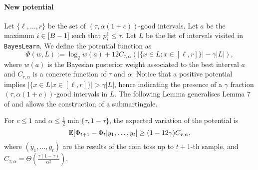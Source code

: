\paragraph{New potential} Let $\{\ell,\dots,r\}$ be the set of $(\tau,\alpha(1+c))$-good intervals. Let $a$ be the maximum $i \in [B-1]$ such that $p^1_i\leq \tau$. Let $L$ be the list of intervals visited in \texttt{BayesLearn}. We define the potential function as 
\begin{equation*}
\label{eq: new potential}
    \Phi(w, L) := \log_2 w(a) + 12 C_{\tau, \alpha}(|\{x\in L : x \in [\ell,r]\}|-\gamma|L|),
\end{equation*}
where $w(a)$ is the Bayesian posterior weight associated to the best interval $a$ and $C_{\tau, \alpha}$ is a concrete function of $\tau$ and $\alpha$.
Notice that a positive potential implies $|\{x\in L | x \in [\ell,r]\}| >\gamma |L|$, hence indicating the presence of a $\gamma$ fraction $(\tau, \alpha(1+c))$-good intervals in $L$. The following Lemma generalises Lemma 7 of \cite{gretta2023sharp} and allows the construction of a submartingale.

\begin{lemma}
    \label{lemma: increase in expectation of the potential}
    For $c\leq 1$ and $\alpha \leq \frac{1}{2}\min\{\tau, 1-\tau\}$, the expected variation of the potential is 
    \begin{equation}
        \mathbb{E}[\Phi_{t+1}-\Phi_{t}|y_{1}, \dots, y_t] \geq (1-12\gamma)C_{\tau, \alpha},
    \end{equation}
    where $(y_1, \dots, y_t)$ are the results of the coin toss up to $t+1$-th sample, and $C_{\tau, \alpha} = \Theta\left(\frac{\tau(1-\tau)}{\alpha^2}\right)$.
\end{lemma}

